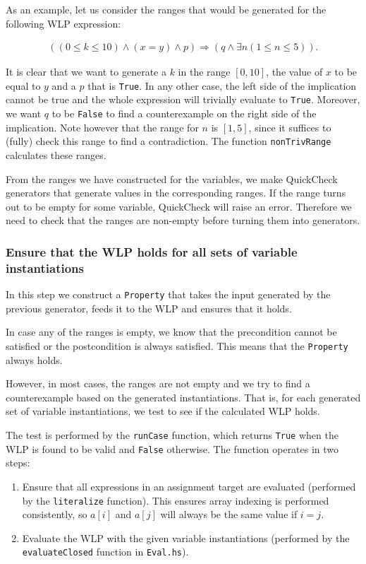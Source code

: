 \documentclass[a4paper]{article}
\begin{document}
As an example, let us consider the ranges that would be generated for the following WLP
expression:

\begin{align*}
	((0 \leq k \leq 10) \wedge (x = y) \wedge p) \Rightarrow (q \wedge \exists n (1 \leq n \leq 5)).
\end{align*}

It is clear that we want to generate a $k$ in the range $[0, 10]$, the value of
$x$ to be equal to $y$ and a $p$ that is \texttt{True}. In any other case, the
left side of the implication cannot be true and the whole expression will
trivially evaluate to \texttt{True}. Moreover, we want $q$ to be \texttt{False}
to find a counterexample on the right side of the implication. Note however that
the range for $n$ is $[1, 5]$, since it suffices to (fully) check this range to
find a contradiction. The function \texttt{nonTrivRange} calculates these
ranges.

From the ranges we have constructed for the variables, we make QuickCheck
generators that generate values in the corresponding ranges. If the range turns
out to be empty for some variable, QuickCheck will raise an error. Therefore
we need to check that the ranges are non-empty before turning them into generators.

\subsubsection*{Ensure that the WLP holds for all sets of variable instantiations}

In this step we construct a \texttt{Property} that takes the input generated by
the previous generator, feeds it to the WLP and ensures that it holds.

In case any of the ranges is empty, we know that the precondition cannot be
satisfied or the postcondition is always satisfied. This means that the
\texttt{Property} always holds. 

However, in most cases, the ranges are not empty and we try to find a counterexample
based on the generated instantiations. That is, for each generated set of variable
instantiations, we test to see if the calculated WLP holds.

The test is performed by the \texttt{runCase} function, which returns \texttt{True}
when the WLP is found to be valid and \texttt{False} otherwise. The function
operates in two steps:

\begin{enumerate}
\item Ensure that all expressions in an assignment target are evaluated (performed
by the \texttt{literalize} function). This ensures array indexing is performed
consistently, so $a[i]$ and $a[j]$ will always be the same value if $i = j$.
\item Evaluate the WLP with the given variable instantiations (performed by the
\texttt{evaluateClosed} function in \texttt{Eval.hs}).
\end{enumerate}
\end{document}
